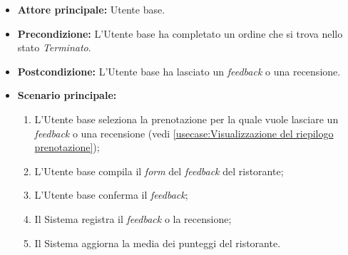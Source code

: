 \label{usecase:Inserimento di feedback e recensioni}
\begin{itemize}
	\item \textbf{Attore principale:} Utente base.

	\item \textbf{Precondizione:} L'Utente base ha completato un ordine che si
	      trova nello stato \textit{Terminato}.

	\item \textbf{Postcondizione:} L'Utente base ha lasciato un \textit{feedback} o una recensione.

	\item \textbf{Scenario principale:}
	      \begin{enumerate}
		      \item L'Utente base seleziona la prenotazione per la quale vuole
		            lasciare un \textit{feedback} o una recensione (vedi
		            \autoref{usecase:Visualizzazione del riepilogo prenotazione});

		      \item L'Utente base compila il \textit{form} del \textit{feedback} del ristorante;

		      \item L'Utente base conferma il \textit{feedback};

		      \item Il Sistema registra il \textit{feedback} o la recensione;

		      \item Il Sistema aggiorna la media dei punteggi del ristorante.

	      \end{enumerate}
\end{itemize}
